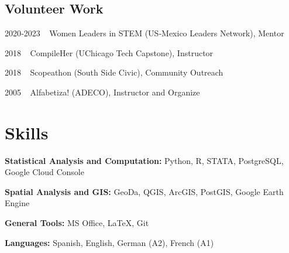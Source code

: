 \documentclass[12pt,letterpaper]{report}
\begin{document}
    \subsection*{Volunteer Work}
    \begin{tablist}
    \item[2020‑2023] $\>$ $\>${}Women Leaders in STEM (US‑Mexico Leaders Network), Mentor
    \item[2018] \tab{}$\>$  $\>$CompileHer (UChicago Tech Capstone), Instructor
    \item[2018] \tab{}$\>$  $\>$Scopeathon (South Side Civic), Community Outreach
    \item[2005] \tab{}$\>$  $\>$Alfabetiza! (ADECO), Instructor and Organize
    \end{tablist}
    
    \section*{Skills}
    \begin{tablist}
        \item[\textbf{Statistical Analysis and Computation:}] Python, R, STATA, PostgreSQL, Google Cloud Console
        \item[\textbf{Spatial Analysis and GIS:}] GeoDa, QGIS, ArcGIS, PostGIS, Google Earth Engine
        \item[\textbf{General Tools:}] MS Office, LaTeX, Git
        \item[\textbf{Languages:}] Spanish, English, German (A2), French (A1)
    \end{tablist}
\end{document}
